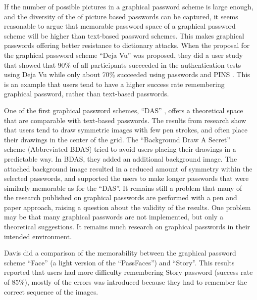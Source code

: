   If the number of possible pictures in a graphical password scheme is large enough, and the diversity of the of picture based passwords can be captured, it seems reasonable to argue that memorable password space of a graphical password scheme will be higher than text-based password schemes. This makes graphical passwords offering better resistance to dictionary attacks. When the proposal for the graphical password scheme ``Deja Vu'' was proposed, they did a user study that showed that 90\% of all participants succeeded in the authentication tests using Deja Vu while only about 70\% succeeded using passwords and PINS \cite{DejaVu}. This is an example that users tend to have a higher success rate remembering graphical password, rather than text-based passwords.

  One of the first graphical password schemes, ``DAS'' \cite{Jermyn}, offers a theoretical space that are comparable with text-based passwords. The results from research show that users tend to draw symmetric images with few pen strokes, and often place their drawings in the center of the grid. The ``Background Draw A Secret'' scheme (Abbreviated BDAS) \cite{BDAS} tried to avoid users placing their drawings in a predictable way. In BDAS, they added an additional background image. The attached background image resulted in a reduced amount of symmetry within the selected passwords, and supported the users to make longer passwords that were similarly memorable as for the ``DAS''. It remains still a problem that many of the research published on graphical passwords are performed with a pen and paper approach, raising a question about the validity of the results. One problem may be that many graphical passwords are not implemented, but only a theoretical suggestions. It remains much research on graphical passwords in their intended environment.

  Davis \cite{Davis} did a comparison of the memorability between the graphical password scheme ``Face'' (a light version of the ``PassFaces'') and ``Story''. This results reported that users had more difficulty remembering Story password (success rate of 85\%), mostly of the errors was introduced because they had to remember the correct sequence of the images.

